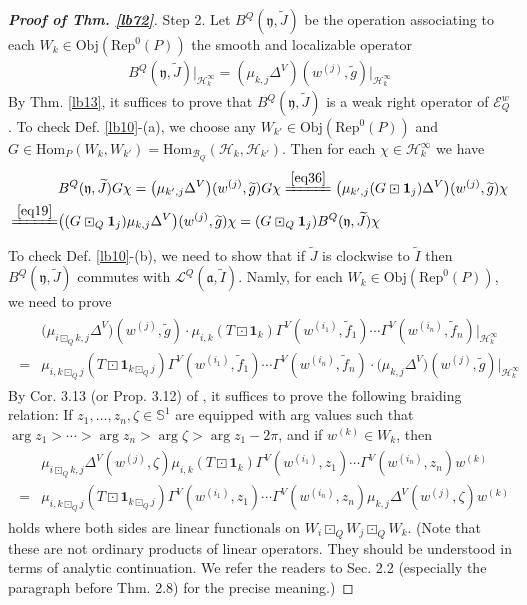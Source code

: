 \documentclass[11pt,b5paper,notitlepage]{article}
\theoremstyle{definition}
\theoremstyle{plain}
\newcommand{\fk}{\mathfrak}
\newcommand{\mc}{\mathcal}
\newcommand{\wtd}{\widetilde}
\newcommand{\idt}{\mathbf{1}}
\newcommand{\Hom}{\mathrm{Hom}}
\newcommand{\Rep}{\mathrm{Rep}}
\newcommand{\scr}{\mathscr}
\newcommand{\yk}{\mathfrak y}
\newcommand{\Sbb}{{\mathbb S}}
\newcommand{\Obj}{\mathrm{Obj}}
\numberwithin{equation}{section}
\begin{document}
\begin{proof}[\textbf{Proof of Thm. \ref{lb72}}]
Step 2. Let $B^Q(\yk,\wtd J)$ be the operation associating to each $W_k\in\Obj(\Rep^0(P))$ the smooth and localizable operator
\begin{align*}
B^Q(\yk,\wtd J)\big|_{\mc H_k^\infty}=(\mu_{k,j}\Delta^V)(w^{(j)},\wtd g)\big|_{\mc H_k^\infty}
\end{align*}
By Thm. \ref{lb13}, it suffices to prove that $B^Q(\yk,\wtd J)$ is a weak right operator of $\scr E^w_Q$. To check Def. \ref{lb10}-(a), we choose any $W_{k'}\in\Obj(\Rep^0(P))$ and $G\in\Hom_P(W_k,W_{k'})=\Hom_{\mc B_Q}(\mc H_k,\mc H_{k'})$. Then for each $\chi\in\mc H_k^\infty$ we have
\begin{align*}
&B^Q(\yk,\wtd J)G\chi=\big(\mu_{k',j}\Delta^V\big)(w^{(j)},\wtd g)G\chi\xlongequal{\eqref{eq36}}\big(\mu_{k',j}(G\boxdot\idt_j)\Delta^V\big)(w^{(j)},\wtd g)\chi\\
\xlongequal{\eqref{eq19}}&\big((G\boxdot_Q\idt_j)\mu_{k,j}\Delta^V\big)(w^{(j)},\wtd g)\chi=(G\boxdot_Q\idt_j)B^Q(\yk,\wtd J)\chi
\end{align*}

To check Def. \ref{lb10}-(b), we need to show that if $\wtd J$ is clockwise to $\wtd I$ then $B^Q(\yk,\wtd J)$ commutes with $\mc L^Q(\fk a,\wtd I)$. Namly, for each $W_k\in\Obj(\Rep^0(P))$, we need to prove
\begin{align}
\begin{aligned}
&\big(\mu_{i\boxdot_Qk,j}\Delta^V\big)(w^{(j)},\wtd g)\cdot\mu_{i,k}(T\boxdot\idt_k) \Gamma^V(w^{(i_1)},\wtd f_1)\cdots \Gamma^V(w^{(i_n)},\wtd f_n)\big|_{\mc H_k^\infty}\\
=&\mu_{i,k\boxdot_Qj}(T\boxdot\idt_{k\boxdot_Qj})\Gamma^V(w^{(i_1)},\wtd f_1)\cdots \Gamma^V(w^{(i_n)},\wtd f_n)\cdot\big(\mu_{k,j}\Delta^V\big)(w^{(j)},\wtd g)\big|_{\mc H_k^\infty}
\end{aligned}
\end{align}
By Cor. 3.13 (or Prop. 3.12) of \cite{Gui19a}, it suffices to prove the following braiding relation: If $z_1,\dots,z_n,\zeta\in\Sbb^1$ are equipped with arg values such that $\arg z_1>\cdots>\arg z_n>\arg\zeta>\arg z_1-2\pi$, and if $w^{(k)}\in W_k$, then
\begin{align}
\begin{aligned}
&\mu_{i\boxdot_Qk,j}\Delta^V(w^{(j)},\zeta)\mu_{i,k}(T\boxdot\idt_k) \Gamma^V(w^{(i_1)},z_1)\cdots \Gamma^V(w^{(i_n)},z_n)w^{(k)}\\
=&\mu_{i,k\boxdot_Qj}(T\boxdot\idt_{k\boxdot_Qj})\Gamma^V(w^{(i_1)},z_1)\cdots \Gamma^V(w^{(i_n)},z_n)\mu_{k,j}\Delta^V(w^{(j)},\zeta)w^{(k)}
\end{aligned}
\end{align}
holds where both sides are linear functionals on $W_i\boxdot_Q W_j\boxdot_Q W_k$. (Note that these are not ordinary products of linear operators. They should be understood in terms of analytic continuation. We refer the readers to \cite{Gui19a} Sec. 2.2 (especially the paragraph before Thm. 2.8) for the precise meaning.)


\end{proof}
\end{document}
